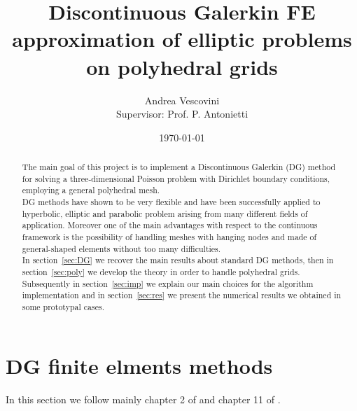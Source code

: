 \documentclass[12pt, a4paper]{article}
\title{\textbf{Discontinuous Galerkin FE approximation of elliptic problems on polyhedral grids}}
\author{Andrea Vescovini\\[1cm]{\small Supervisor: Prof. P. Antonietti}}
\date{\today}
\theoremstyle{definition}
\theoremstyle{plain}
\theoremstyle{plain}
\begin{document}
\maketitle
\newpage
\begin{abstract}
	The main goal of this project is to implement a Discontinuous Galerkin (DG) method for solving a three-dimensional Poisson problem with Dirichlet boundary conditions, employing a general polyhedral mesh.\\
	DG methods have shown to be very flexible and have been successfully applied to hyperbolic, elliptic and parabolic problem arising from many different fields of application.
	Moreover one of the main advantages with respect to the continuous framework is the possibility of handling meshes with hanging nodes and made of general-shaped elements without too many difficulties.\\
	In section~\ref{sec:DG} we recover the main results about standard DG methods, then in section~\ref{sec:poly} we develop the theory in order to handle polyhedral grids. Subsequently in section~\ref{sec:imp} we explain our main choices for the algorithm implementation and in section~\ref{sec:res} we present the numerical results we obtained in some prototypal cases.
\end{abstract}
\newpage
{}
\tableofcontents
\newpage



\section{DG finite elments methods}\label{sec:DG}
In this section we follow mainly chapter 2 of \cite{riviere} and chapter 11 of \cite{quart}.
\end{document}
